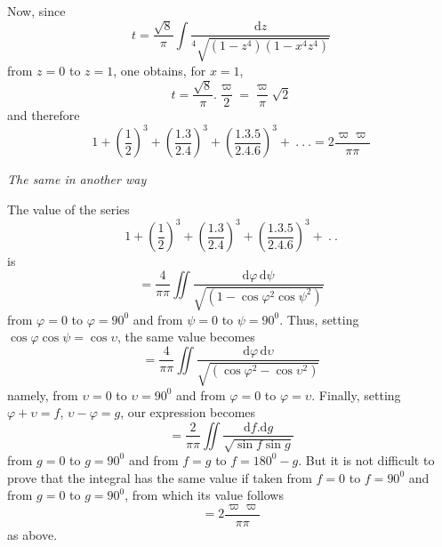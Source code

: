 Now, since
\[
t=\frac{\surd 8}{\pi}\int\frac{\mathrm dz}{{}^{4}\!\surd{(1-z^4)(1-x^4z^4)}}
\]
from $z=0$ to $z=1$, one obtains, for $x=1$,
\[
t=\frac{\surd 8}{\pi}.\frac{\varpi}{2}=\frac{\varpi}{\pi}\surd 2
\]
and therefore
\[
1+\left(\frac12\right)^3+\left(\frac{1.3}{2.4}\right)^3+
\left(\frac{1.3.5}{2.4.6}\right)^3+\ .\ .\ .=2\frac{\varpi\varpi}{\pi\pi}
\]
\begin{center}\textit{The same in another way}\end{center}
The value of the series
\[
1+\left(\frac12\right)^3+\left(\frac{1.3}{2.4}\right)^3+
\left(\frac{1.3.5}{2.4.6}\right)^3+\ .\ .
\]
is
\[
=\frac4{\pi\pi}\iint\frac{\mathrm d\varphi\,\mathrm d\psi}{\surd {(1-\cos\varphi^2\cos\psi^2)}}
\]
from $\varphi=0$ to $\varphi=90^0$ and from $\psi=0$ to $\psi=90^0$.
Thus, setting $\cos\varphi\cos\psi=\cos\upsilon$, the same value becomes
\[
=\frac4{\pi\pi}\iint\frac{\mathrm d\varphi\,\mathrm d\upsilon}{\surd {(\cos\varphi^2-\cos\upsilon^2)}}
\]
namely, from $\upsilon=0$ to $\upsilon=90^0$ and from $\varphi=0$ to $\varphi=\upsilon$.
Finally, setting $\varphi+\upsilon=f$, $\upsilon-\varphi=g$, our expression becomes
\[
=\frac2{\pi\pi}\iint\frac{\mathrm df.\mathrm dg}{\surd {\sin f\sin g}}
\]
from $g=0$ to $g=90^0$ and from $f=g$ to $f=180^0-g$.
But it is not difficult to prove that the integral has the same value if taken
from $f=0$ to $f=90^0$ and from $g=0$ to $g=90^0$, from which its value follows
\[
=2\frac{\varpi\varpi}{\pi\pi}
\]
as above.

\clearpage
\endgroup
